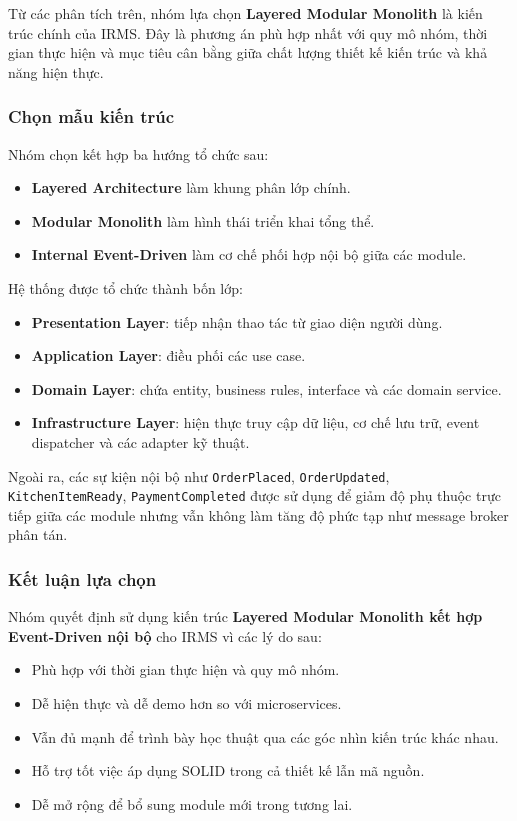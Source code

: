 \documentclass[12pt,a4paper]{article}
\begin{document}
Từ các phân tích trên, nhóm lựa chọn \textbf{Layered Modular Monolith} là kiến trúc chính của IRMS. Đây là phương án phù hợp nhất với quy mô nhóm, thời gian thực hiện và mục tiêu cân bằng giữa chất lượng thiết kế kiến trúc và khả năng hiện thực.

\subsubsection{Chọn mẫu kiến trúc}

Nhóm chọn kết hợp ba hướng tổ chức sau:
\begin{itemize}
    \item \textbf{Layered Architecture} làm khung phân lớp chính.
    \item \textbf{Modular Monolith} làm hình thái triển khai tổng thể.
    \item \textbf{Internal Event-Driven} làm cơ chế phối hợp nội bộ giữa các module.
\end{itemize}

Hệ thống được tổ chức thành bốn lớp:
\begin{itemize}
    \item \textbf{Presentation Layer}: tiếp nhận thao tác từ giao diện người dùng.
    \item \textbf{Application Layer}: điều phối các use case.
    \item \textbf{Domain Layer}: chứa entity, business rules, interface và các domain service.
    \item \textbf{Infrastructure Layer}: hiện thực truy cập dữ liệu, cơ chế lưu trữ, event dispatcher và các adapter kỹ thuật.
\end{itemize}

Ngoài ra, các sự kiện nội bộ như \texttt{OrderPlaced}, \texttt{OrderUpdated}, \texttt{KitchenItemReady}, \texttt{PaymentCompleted} được sử dụng để giảm độ phụ thuộc trực tiếp giữa các module nhưng vẫn không làm tăng độ phức tạp như message broker phân tán.

\subsubsection{Kết luận lựa chọn}

Nhóm quyết định sử dụng kiến trúc \textbf{Layered Modular Monolith kết hợp Event-Driven nội bộ} cho IRMS vì các lý do sau:
\begin{itemize}
    \item Phù hợp với thời gian thực hiện và quy mô nhóm.
    \item Dễ hiện thực và dễ demo hơn so với microservices.
    \item Vẫn đủ mạnh để trình bày học thuật qua các góc nhìn kiến trúc khác nhau.
    \item Hỗ trợ tốt việc áp dụng SOLID trong cả thiết kế lẫn mã nguồn.
    \item Dễ mở rộng để bổ sung module mới trong tương lai.
\end{itemize}
\end{document}
